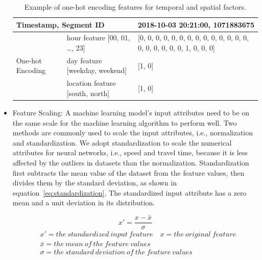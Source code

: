 \documentclass[english]{kththesis}
\begin{document}
\begin{itemize}
\begin{table}[]
\begin{tabular}{@{} m{} m{} m{}@{}}
\toprule
\multicolumn{2}{l}{Timestamp, Segment ID} & 2018-10-03 20:21:00, 1071883675 \\ 
\midrule
\multirow{3}{4em}{One-hot Encoding} & hour feature {[}00, 01, …, 23{]} & {[}0, 0, 0, 0, 0, 0, 0, 0, 0, 0, 0, 0, 0, 0, 0, 0, 0, 0, 0, 0, 1, 0, 0, 0{]} \\ 
\cmidrule(l){2-3} 
& day feature {[}weekday, weekend{]} & {[}1, 0{]} \\ 
\cmidrule(l){2-3} 
& location feature {[}south, north{]} & {[}1, 0{]} \\ 
\bottomrule
\end{tabular}
\caption{Example of one-hot encoding features for temporal and spatial factors.}
\label{tab:oneHot}
\end{table}
    
    \item Feature Scaling: A machine learning model's input attributes need to be on the same scale for the machine learning algorithm to perform well. Two methods are commonly used to scale the input attributes, i.e., normalization and standardization. We adopt standardization to scale the numerical attributes for neural networks, i.e., speed and travel time, because it is less affected by the outliers in datasets than the normalization. Standardization first subtracts the mean value of the dataset from the feature values, then divides them by the standard deviation, as shown in equation~\ref{eq:standardization}. The standardized input attribute has a zero mean and a unit deviation in its distribution.
    
    \begin{equation}
        {x}'=\frac{x-\bar{x}}{\sigma}
        \label{eq:standardization}
    \end{equation}
    \begin{align*}
    & {x}'=the \ standardized \ input \ feature \quad x=the \ original \ feature \\
    & \bar{x} = the \ mean \ of \ the \ feature \ values\\
    & \sigma = the \ standard \ deviation \ of \ the \ feature \ values
    \end{align*}
\end{itemize}
\end{document}
